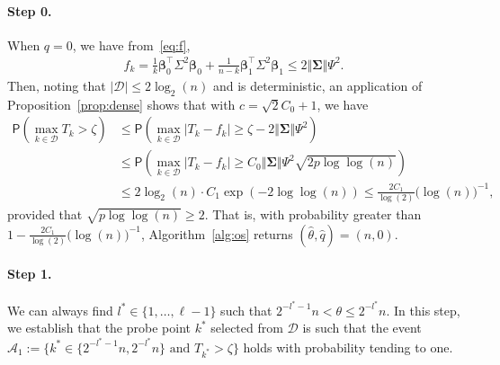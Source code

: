 \documentclass[11pt, a4paper]{article}
\newcommand{\mc}{\mathcal}
\renewcommand{\l}{\left}
\renewcommand{\r}{\right}
\def\wh{\widehat}
\newcommand{\cp}{\theta}
\newcommand{\p}{\mathsf{P}}
\theoremstyle{definition}
\theoremstyle{definition}
\theoremstyle{definition}
\theoremstyle{definition}
\theoremstyle{definition}
\theoremstyle{remark}
\theoremstyle{definition}
\theoremstyle{definition}
\theoremstyle{definition}
\begin{document}
\paragraph{Step 0.} 
When $q = 0$, we have from~\eqref{eq:f},
\begin{align*}
f_k = \frac{1}{k} \bm\beta_0^\top \Sigma^2 \bm\beta_0 + \frac{1}{n - k} \bm\beta_1^\top \Sigma^2 \bm\beta_1 \le 2 \Vert \bm\Sigma \Vert \Psi^2.
\end{align*}
Then, noting that $\vert \mc D \vert \le 2 \log_2(n)$ and is deterministic, an application of Proposition~\ref{prop:dense} shows that with $c = \sqrt{2} C_0 + 1$, we have 
\begin{align*}
\p\l( \max_{k \in \mc D} T_k > \zeta \r) 
&\le \p\l( \max_{k \in \mc D} \vert T_k - f_k \vert \ge \zeta - 2 \Vert \bm\Sigma \Vert \Psi^2 \r)
\\
&\le \p\l( \max_{k \in \mc D} \vert T_k - f_k \vert \ge C_0 \Vert \bm\Sigma \Vert \Psi^2 \sqrt{2 p\log\log(n)} \r)
\\
&\le 2 \log_2(n) \cdot C_1 \exp(- 2 \log\log(n)) \le \frac{2 C_1}{\log(2)} \bigl(\log(n)\bigr)^{-1},
\end{align*}
provided that $\sqrt{p\log\log(n)} \ge 2$. 
That is, with probability greater than $1 - \tfrac{2 C_1}{\log(2)} \bigl(\log(n)\bigr)^{-1}$, Algorithm~\ref{alg:os} returns $(\wh\cp, \wh q) = (n, 0)$.

\paragraph{Step 1.}
We can always find $l^* \in \{1, \ldots, \ell - 1\}$ such that $2^{-l^* - 1}n < \cp \le 2^{-l^*} n$. In this step, we establish that the probe point $k^*$ selected from $\mc D$ is such that the event $\mc A_1 := \{ k^* \in \{ 2^{-l^*  - 1}n, 2^{-l^*}n \} \text{ \ and \ } T_{k^*} > \zeta \}$ holds with probability tending to one. 
\end{document}
